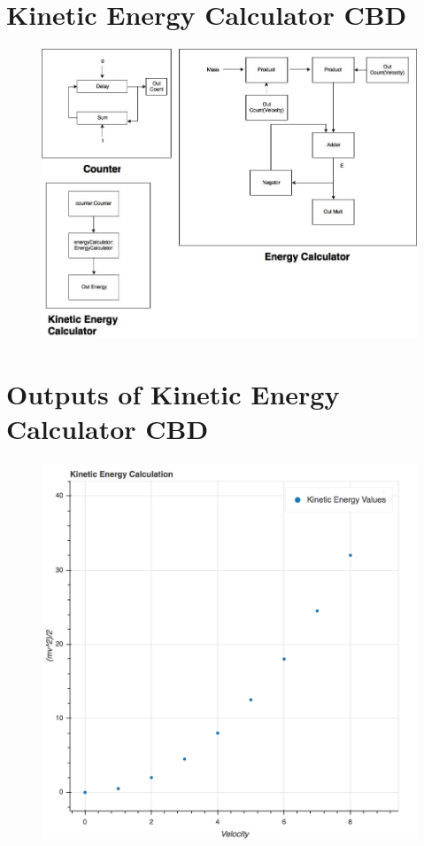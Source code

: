 \documentclass{article}
\begin{document}
\begin{appendices}
\section{Kinetic Energy Calculator CBD}
\label{appendix:kinetic}
\begin{figure}[!ht]
  \centering
  \includegraphics[width = 15cm]{kinetic.jpg}  
\end{figure}
\newpage
\section{Outputs of Kinetic Energy Calculator CBD}
\label{appendix:plot}
\begin{figure}[!ht]
  \centering
  \includegraphics[width = 15cm]{plot.jpg}  
\end{figure}
\newpage

\end{appendices}
\end{document}
